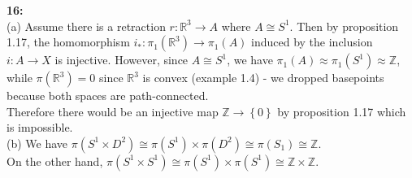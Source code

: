 \documentclass[a4paper]{article}
\begin{document}
    \textbf{16:}\\
    (a) Assume there is a retraction $r  \colon \mathbb{R}^3 \to A$ where $A
    \cong S^{1}$. Then by proposition 1.17, the 
    homomorphism $i_*  \colon \pi_1 \left( \mathbb{R}^3 \right) 
    \to \pi_1\left( A \right) $ induced by the inclusion 
    $i  \colon A \to X$ is injective. However, since $A \cong S^{1}$, we have
    $\pi_1 \left( A \right) \approx \pi_1 \left( S^{1} \right) \approx
    \mathbb{Z} $,
    while $\pi\left( \mathbb{R}^3 \right) = 0$ since $\mathbb{R}^3$ is convex
    (example 1.4) - we dropped basepoints because both spaces are
    path-connected.\\
    Therefore there would be an injective map $\mathbb{Z} \to \left\{
    0 \right\}  $ by proposition 1.17 which is impossible.\\
    \linebreak
    (b) We have $\pi \left( S^{1} \times D^2 \right) \cong \pi\left( S^{1} \right)
    \times \pi \left( D^2 \right) \cong \pi(S_1) \cong \mathbb{Z}$.\\
    On the other hand, $\pi \left( S^{1} \times S^{1} \right) 
    \cong \pi\left( S^{1} \right) \times  \pi\left( S^{1} \right) \cong
    \mathbb{Z} \times \mathbb{Z}$.\\
\end{document}
